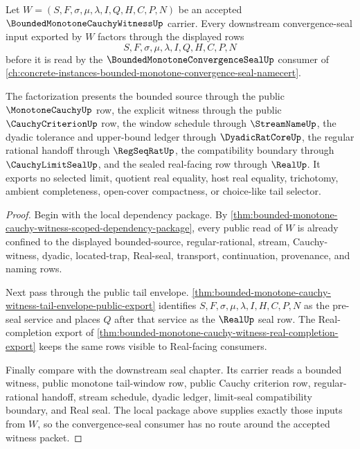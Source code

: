 \begin{theorem}
\label{thm:bounded-monotone-cauchy-witness-convergence-seal-input-package}
Let $W=(S,F,\sigma,\mu,\lambda,I,Q,H,C,P,N)$ be an accepted $\BoundedMonotoneCauchyWitnessUp$ carrier. Every downstream convergence-seal input exported by $W$ factors through the displayed rows
$$
S,F,\sigma,\mu,\lambda,I,Q,H,C,P,N
$$
before it is read by the $\BoundedMonotoneConvergenceSealUp$ consumer of \autoref{ch:concrete-instances-bounded-monotone-convergence-seal-namecert}.

The factorization presents the bounded source through the public $\MonotoneCauchyUp$ row, the explicit witness through the public $\CauchyCriterionUp$ row, the window schedule through $\StreamNameUp$, the dyadic tolerance and upper-bound ledger through $\DyadicRatCoreUp$, the regular rational handoff through $\RegSeqRatUp$, the compatibility boundary through $\CauchyLimitSealUp$, and the sealed real-facing row through $\RealUp$. It exports no selected limit, quotient real equality, host real equality, trichotomy, ambient completeness, open-cover compactness, or choice-like tail selector.
\end{theorem}
\begin{proof}
Begin with the local dependency package. By \autoref{thm:bounded-monotone-cauchy-witness-scoped-dependency-package}, every public read of $W$ is already confined to the displayed bounded-source, regular-rational, stream, Cauchy-witness, dyadic, located-trap, Real-seal, transport, continuation, provenance, and naming rows.

Next pass through the public tail envelope. \autoref{thm:bounded-monotone-cauchy-witness-tail-envelope-public-export} identifies $S,F,\sigma,\mu,\lambda,I,H,C,P,N$ as the pre-seal service and places $Q$ after that service as the $\RealUp$ seal row. The Real-completion export of \autoref{thm:bounded-monotone-cauchy-witness-real-completion-export} keeps the same rows visible to Real-facing consumers.

Finally compare with the downstream seal chapter. Its carrier reads a bounded witness, public monotone tail-window row, public Cauchy criterion row, regular-rational handoff, stream schedule, dyadic ledger, limit-seal compatibility boundary, and Real seal. The local package above supplies exactly those inputs from $W$, so the convergence-seal consumer has no route around the accepted witness packet.
\end{proof}


